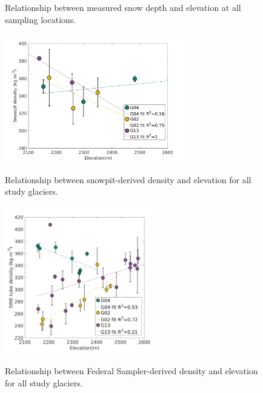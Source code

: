 \documentclass[12pt]{article}
\begin{document}
\begin{figure}[H]
	\caption{Relationship between measured snow depth and elevation at all sampling locations.}
	\label{fig:depth_elev}
\end{figure}


\begin{figure}[H]
	\centering
	\includegraphics[width = 0.7\textwidth]{ElevationVsSnowpit_all.png}\\
	\caption{Relationship between snowpit-derived density and elevation for all study glaciers.}
	\label{fig:elev_snowpit}
\end{figure}


\begin{figure}[H]
	\centering
	\includegraphics[width = 0.6\textwidth]{ElevationVsSWEtube_all.png}\\
	\caption{Relationship between Federal Sampler-derived density and elevation for all study glaciers.}
	\label{fig:elev_tube}
\end{figure}
\end{document}
